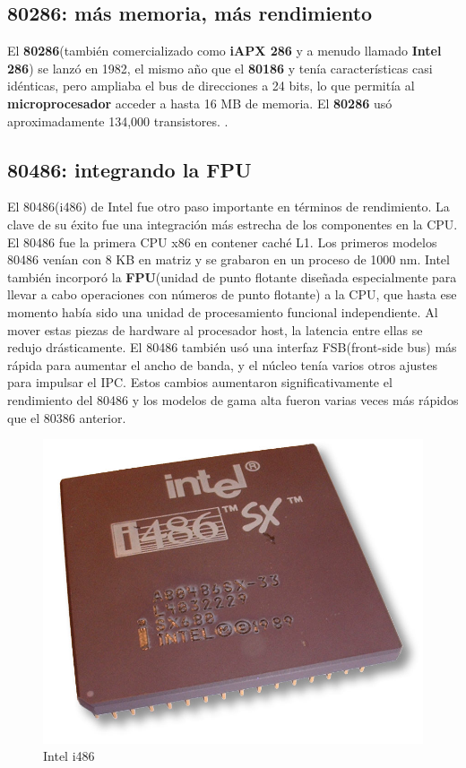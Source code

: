 \subsection{\textbf{80286}: más memoria, más rendimiento}
El \textbf{80286}(también comercializado como \textbf{iAPX 286} y a menudo llamado \textbf{Intel 286}) se lanzó en 1982, el mismo año que el \textbf{80186} y tenía
características casi idénticas, pero ampliaba el bus de direcciones a 24 bits, lo que permitía al \textbf{microprocesador} acceder a hasta 16 MB de memoria.
El \textbf{80286} usó aproximadamente 134,000 transistores. .

\subsection{80486: integrando la FPU}
El 80486(i486) de Intel fue otro paso importante en términos de rendimiento. La clave de su éxito fue una integración más estrecha de los componentes 
en la CPU. El 80486 fue la primera CPU x86 en contener caché L1. Los primeros modelos 80486 venían con 8 KB en matriz y se grabaron en un proceso de 1000 nm.
Intel también incorporó la \textbf{FPU}(unidad de punto flotante diseñada especialmente para llevar a cabo operaciones con números de punto flotante) a la CPU, que hasta ese 
momento había sido una unidad de procesamiento funcional independiente. Al mover estas piezas de hardware al procesador host, la latencia entre ellas se redujo 
drásticamente. El 80486 también usó una interfaz FSB(front-side bus) más rápida para aumentar el ancho de banda, y el núcleo 
tenía varios otros ajustes para impulsar el IPC. Estos cambios aumentaron significativamente el rendimiento del 80486 y los modelos de gama alta fueron varias 
veces más rápidos que el 80386 anterior. 

\begin{figure}[htb]
	\centering
	\includegraphics[scale = 0.15]{Graphics/Intel_80486sx.jpg}
	\caption{Intel i486}
	\label{fig:21}
\end{figure}

